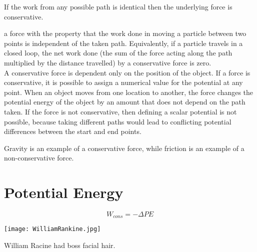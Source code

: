 
\begin{marginfigure}[0pt]
 \caption{If the work from any possible path is identical then the underlying force is conservative.}
  \label{fig:marginfig}
\end{marginfigure}

 a force with the property that the work done in moving a particle between two points is independent of the taken path.  Equivalently, if a particle travels in a closed loop, the net work done (the sum of the force acting along the path multiplied by the distance travelled) by a conservative force is zero.\\

A conservative force is dependent only on the position of the object. If a force is conservative, it is possible to assign a numerical value for the potential at any point. When an object moves from one location to another, the force changes the potential energy of the object by an amount that does not depend on the path taken. If the force is not conservative, then defining a scalar potential is not possible, because taking different paths would lead to conflicting potential differences between the start and end points.

Gravity is an example of a conservative force, while friction is an example of a non-conservative force.


\section{Potential Energy}
$$W_{cons}=-\Delta PE$$
\begin{marginfigure}[60pt]%
  \texttt{[image: WilliamRankine.jpg]}
  \caption{William Racine had boss facial hair.}
  \label{fig:marginfig}
\end{marginfigure}

